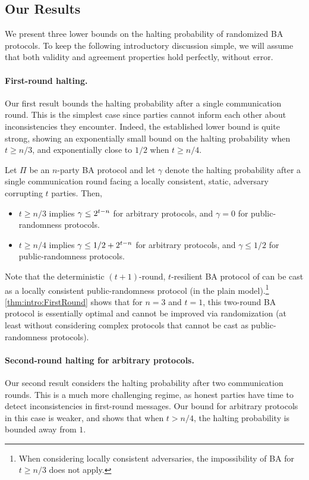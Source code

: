 \subsection{Our Results}\label{sec:intro:ourResult}
We present three lower bounds on the halting probability of randomized BA protocols.
To keep the following introductory discussion simple, we will assume that both validity and agreement properties hold perfectly, without error.

\paragraph{First-round halting.}
Our first result bounds the halting probability after a single communication round. This is the simplest case since parties cannot inform each other about inconsistencies they encounter. Indeed, the established lower bound is quite strong, showing an exponentially small bound on the halting probability when $t\geq n/3$, and exponentially close to $1/2$ when $t\geq n/4$.

\begin{theorem}\label{thm:intro:FirstRound}
Let $\Pi$ be an $n$-party BA protocol and let $\gamma$ denote the halting probability after a single communication round facing a locally consistent, static, adversary corrupting $t$ parties. Then,
\begin{itemize}
	\item $t \ge n/3$ implies $\gamma \le 2^{t-n}$ for arbitrary protocols, and $\gamma=0$ for public-randomness protocols.
	\item $t \ge n/4$ implies $\gamma \le 1/2+2^{t-n}$ for arbitrary protocols, and $\gamma \leq 1/2$ for public-randomness protocols.
\end{itemize}
\end{theorem}

Note that the deterministic $(t+1)$-round, $t$-resilient BA protocol of \citet{DS83} can be cast as a locally consistent public-randomness protocol (in the plain model).\footnote{When considering locally consistent adversaries, the impossibility of BA for $t\geq n/3$ does not apply.}
\cref{thm:intro:FirstRound} shows that for $n=3$ and $t=1$, this two-round BA protocol is essentially optimal and cannot be improved via randomization (at least without considering complex protocols that cannot be cast as public-randomness protocols).

\paragraph{Second-round halting for arbitrary protocols.}
Our second result considers the halting probability after two communication rounds.
This is a much more challenging regime, as honest parties have time to detect inconsistencies in first-round messages. Our bound for arbitrary protocols in this case is weaker, and shows that when $t>n/4$, the halting probability is bounded away from $1$.

